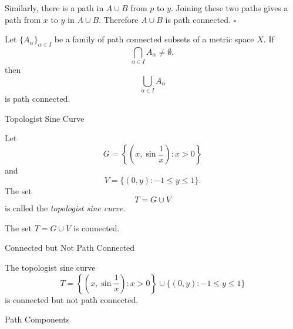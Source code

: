 \documentclass[12pt, a4paper]{article}
\begin{document}
Similarly, there is a path in $A\cup B$ from $p$ to $y$. Joining these two paths gives a path from $x$ to $y$ in $A\cup B$. Therefore $A\cup B$ is path connected. \hfill $\square$

\vspace{20pt}

\begin{theorem}
Let $\{A_\alpha\}_{\alpha\in I}$ be a family of path connected subsets of a metric space $X$. If
\[
    \bigcap_{\alpha\in I}A_\alpha\neq\emptyset,
\]
then
\[
    \bigcup_{\alpha\in I}A_\alpha
\]
is path connected.
\end{theorem}

\clearpage

\begin{heading}
    Topologist Sine Curve
\end{heading}

\vspace{10pt}

\begin{definition}
Let
\[
    G=\left\{\left(x,\sin\frac1x\right):x>0\right\}
\]
and
\[
    V=\{(0,y):-1\leq y\leq 1\}.
\]
The set
\[
    T=G\cup V
\]
is called the \textit{topologist sine curve}.
\end{definition}

\clearpage

\begin{theorem}
The set $T=G\cup V$ is connected.
\end{theorem}



\clearpage

\begin{heading}
    Connected but Not Path Connected
\end{heading}

\vspace{10pt}

\begin{theorem}
The topologist sine curve
\[
    T=\left\{\left(x,\sin\frac1x\right):x>0\right\}\cup\{(0,y):-1\leq y\leq 1\}
\]
is connected but not path connected.
\end{theorem}



\clearpage

\begin{heading}
    Path Components
\end{heading}
\end{document}
